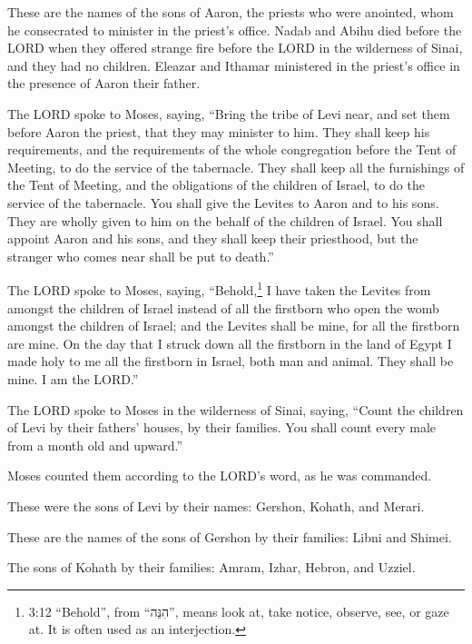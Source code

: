  These are the names of the sons of Aaron, the priests who
were anointed, whom he consecrated to minister in the priest's office.
 Nadab and Abihu died before the LORD when they offered
strange fire before the LORD in the wilderness of Sinai, and they had no
children. Eleazar and Ithamar ministered in the priest's office in the
presence of Aaron their father.

 The LORD spoke to Moses, saying,  ``Bring the
tribe of Levi near, and set them before Aaron the priest, that they may
minister to him.  They shall keep his requirements, and the
requirements of the whole congregation before the Tent of Meeting, to do
the service of the tabernacle.  They shall keep all the
furnishings of the Tent of Meeting, and the obligations of the children
of Israel, to do the service of the tabernacle.  You shall
give the Levites to Aaron and to his sons. They are wholly given to him
on the behalf of the children of Israel.  You shall appoint
Aaron and his sons, and they shall keep their priesthood, but the
stranger who comes near shall be put to death.''

 The LORD spoke to Moses, saying, 
``Behold,\footnote{3:12 ``Behold'', from ``הִנֵּה'', means look at, take
  notice, observe, see, or gaze at. It is often used as an interjection.}
I have taken the Levites from amongst the children of Israel instead of
all the firstborn who open the womb amongst the children of Israel; and
the Levites shall be mine,  for all the firstborn are mine.
On the day that I struck down all the firstborn in the land of Egypt I
made holy to me all the firstborn in Israel, both man and animal. They
shall be mine. I am the LORD.''

 The LORD spoke to Moses in the wilderness of Sinai,
saying,  ``Count the children of Levi by their fathers'
houses, by their families. You shall count every male from a month old
and upward.''

 Moses counted them according to the LORD's word, as he was
commanded.

 These were the sons of Levi by their names: Gershon,
Kohath, and Merari.

 These are the names of the sons of Gershon by their
families: Libni and Shimei.

 The sons of Kohath by their families: Amram, Izhar,
Hebron, and Uzziel.

